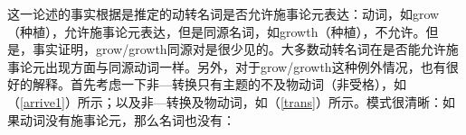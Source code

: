 这一论述的事实根据是推定的动转名词是否允许施事论元表达：动词，如grow（种植），允许施事论元表达，但是同源名词，如growth（种植），不允许。但是，事实证明，grow/growth同源对是很少见的。大多数动转名词在是否能允许施事论元出现方面与同源动词一样。另外，对于grow/growth这种例外情况，也有很好的解释\citep{Wechsler2008a}。首先考虑一下非—转换只有主题的不及物动词（非受格），如（\ref{arrive1}）所示；以及非—转换及物动词，如（\ref{trans}）所示。模式很清晰：如果动词没有施事论元，那么名词也没有：

